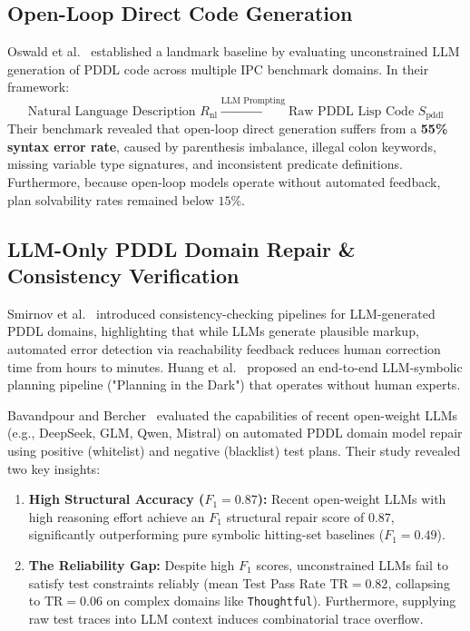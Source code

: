 \subsection{Open-Loop Direct Code Generation}
Oswald et al.~\cite{oswald2024} established a landmark baseline by evaluating unconstrained LLM generation of PDDL code across multiple IPC benchmark domains. In their framework:
\begin{equation}
\text{Natural Language Description } R_{\text{nl}} \xrightarrow{\text{LLM Prompting}} \text{Raw PDDL Lisp Code } S_{\text{pddl}}
\end{equation}
Their benchmark revealed that open-loop direct generation suffers from a \textbf{55\% syntax error rate}, caused by parenthesis imbalance, illegal colon keywords, missing variable type signatures, and inconsistent predicate definitions. Furthermore, because open-loop models operate without automated feedback, plan solvability rates remained below $15\%$.

\subsection{LLM-Only PDDL Domain Repair \& Consistency Verification}
Smirnov et al.~\cite{smirnov2024} introduced consistency-checking pipelines for LLM-generated PDDL domains, highlighting that while LLMs generate plausible markup, automated error detection via reachability feedback reduces human correction time from hours to minutes. Huang et al.~\cite{huang2025} proposed an end-to-end LLM-symbolic planning pipeline ("Planning in the Dark") that operates without human experts.

Bavandpour and Bercher~\cite{bavandpour2026llmonly} evaluated the capabilities of recent open-weight LLMs (e.g., DeepSeek, GLM, Qwen, Mistral) on automated PDDL domain model repair using positive (whitelist) and negative (blacklist) test plans. Their study revealed two key insights:
\begin{enumerate}
    \item \textbf{High Structural Accuracy ($F_1 = 0.87$):} Recent open-weight LLMs with high reasoning effort achieve an $F_1$ structural repair score of $0.87$, significantly outperforming pure symbolic hitting-set baselines ($F_1 = 0.49$).
    \item \textbf{The Reliability Gap:} Despite high $F_1$ scores, unconstrained LLMs fail to satisfy test constraints reliably (mean Test Pass Rate $\text{TR} = 0.82$, collapsing to $\text{TR} = 0.06$ on complex domains like \texttt{Thoughtful}). Furthermore, supplying raw test traces into LLM context induces combinatorial trace overflow.
\end{enumerate}

